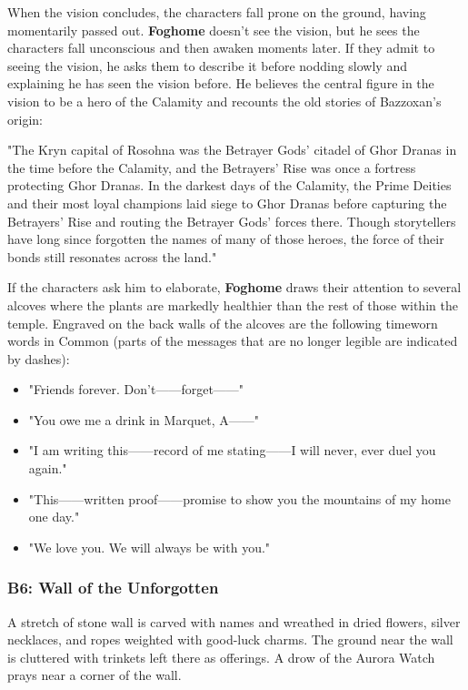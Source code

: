 \documentclass[10pt,a4paper,twoside,bg=print,twocolumn,openany,nodeprecatedcode]{dndbook}
\begin{document}
When the vision concludes, the characters fall prone on the ground, having momentarily passed out. \textbf{Foghome} doesn't see the vision, but he sees the characters fall unconscious and then awaken moments later. If they admit to seeing the vision, he asks them to describe it before nodding slowly and explaining he has seen the vision before. He believes the central figure in the vision to be a hero of the Calamity and recounts the old stories of Bazzoxan's origin:

\begin{DndReadAloud}{}
"The Kryn capital of Rosohna was the Betrayer Gods' citadel of Ghor Dranas in the time before the Calamity, and the Betrayers' Rise was once a fortress protecting Ghor Dranas. In the darkest days of the Calamity, the Prime Deities and their most loyal champions laid siege to Ghor Dranas before capturing the Betrayers' Rise and routing the Betrayer Gods' forces there. Though storytellers have long since forgotten the names of many of those heroes, the force of their bonds still resonates across the land."

\end{DndReadAloud}

If the characters ask him to elaborate, \textbf{Foghome} draws their attention to several alcoves where the plants are markedly healthier than the rest of those within the temple. Engraved on the back walls of the alcoves are the following timeworn words in Common (parts of the messages that are no longer legible are indicated by dashes):


\begin{itemize}
\item "Friends forever. Don't——forget——"
\item "You owe me a drink in Marquet, A——"
\item "I am writing this——record of me stating——I will never, ever duel you again."
\item "This——written proof——promise to show you the mountains of my home one day."
\item "We love you. We will always be with you."
\end{itemize}

\subsubsection{B6: Wall of the Unforgotten}
\begin{DndReadAloud}{}
A stretch of stone wall is carved with names and wreathed in dried flowers, silver necklaces, and ropes weighted with good-luck charms. The ground near the wall is cluttered with trinkets left there as offerings. A drow of the Aurora Watch prays near a corner of the wall.

\end{DndReadAloud}
\end{document}
